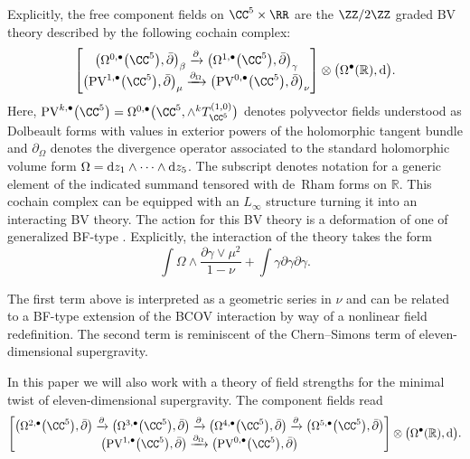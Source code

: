 \documentclass[pdftex]{sigma}
\numberwithin{equation}{section}
\theoremstyle{definition}
\def\R{\mathbb{R}}
\def\d{{\rm d}}
\def\bu{\bullet}
\begin{document}
Explicitly, the free component fields on $\CC^5 \times \RR$ are the $\ZZ/2\ZZ$ graded BV theory described by the following cochain complex:
\begin{equation} \label{eq: comp-min-tw}
\begin{bmatrix}
\big(\Omega^{0,\bu}\big(\CC^5\big) ,\bar{\partial}\big)_\beta \xrightarrow{\partial} \big(\Omega^{1,\bu}\big(\CC^5\big) , \bar{\partial}\big)_\gamma \\
\big(\mathrm{PV}^{1,\bu}\big(\CC^5\big) , \bar{\partial}\big)_\mu \xrightarrow{\partial_{\Omega}} \big(\mathrm{PV}^{0,\bu}\big(\CC^5\big),\bar{\partial}\big)_\nu \\
\end{bmatrix} \otimes \big(\Omega^\bu(\R) ,\d\big).
\end{equation}
Here, $\mathrm{PV}^{k,\bu}\big(\CC^5\big) = \Omega^{0,\bu}\big(\CC^5 , \wedge^k T_{\CC^5}^{(1,0)}\big)$ denotes polyvector fields understood as Dolbeault forms with values in exterior powers of the holomorphic tangent bundle and $\partial_\Omega$ denotes the divergence operator associated to the standard holomorphic volume form $\Omega = \d z_1 \wedge \dots \wedge \d z_5$. The subscript denotes notation for a generic element of the indicated summand tensored with de~Rham forms on $\R$. This cochain complex can be equipped with an $L_\infty$ structure turning it into an interacting BV theory. The action for this BV theory is a deformation of one of generalized BF-type \cite{RSW}. Explicitly, the interaction of the theory takes the form
\[
\int \Omega \wedge \frac{\partial\gamma \vee \mu^2}{1-\nu} + \int \gamma\partial\gamma\partial\gamma.
\]

The first term above is interpreted as a geometric series in $\nu$ and can be related to a BF-type extension of the BCOV interaction by way of a nonlinear field redefinition. The second term is reminiscent of the Chern--Simons term of eleven-dimensional supergravity.

In this paper we will also work with a theory of field strengths for the minimal twist of eleven-dimensional supergravity. The component fields read
\begin{equation} \label{eq: comp-min-tw-str}
\begin{bmatrix}
\big(\Omega^{2,\bu}\big(\CC^5\big) , \bar{\partial}\big) \xrightarrow{\partial} \big(\Omega^{3,\bu}\big(\CC^5\big) , \bar{\partial}\big) \xrightarrow{\partial} \big(\Omega^{4,\bu}\big(\CC^5\big) , \bar{\partial}\big) \xrightarrow{\partial} \big(\Omega^{5,\bu}\big(\CC^5\big) , \bar{\partial}\big) \\
\big(\mathrm{PV}^{1,\bu}\big(\CC^5\big) , \bar{\partial}\big) \xrightarrow{\partial_{\Omega}}\big(\mathrm{PV}^{0,\bu}\big(\CC^5\big),\bar{\partial}\big)
\end{bmatrix} \otimes \big(\Omega^\bu(\R) ,\d\big).
\end{equation}
\end{document}
